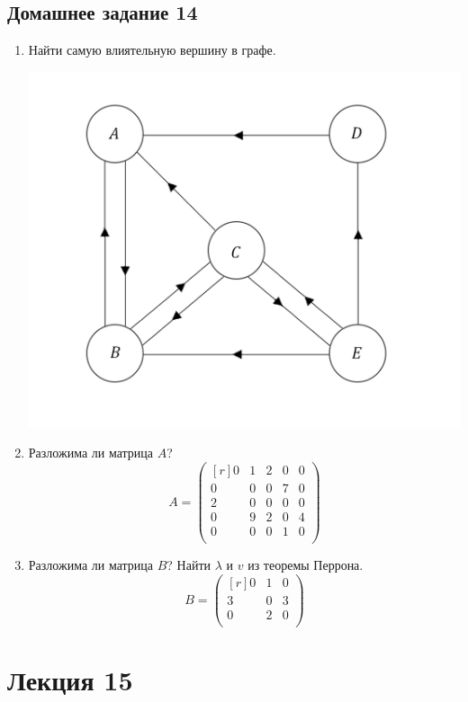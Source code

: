 \documentclass[12pt]{article}
\begin{document}
	\subsection{Домашнее задание 14}\begin{enumerate}
		\item Найти самую влиятельную вершину в графе.
		\begin{center}
			\includegraphics[scale=0.35]{l14_5_.png}\\
		\end{center}
		\item Разложима ли матрица $A$?
		\[A = \begin{pmatrix}[r]
		0 & 1 & 2 & 0 & 0\\
		0 & 0 & 0 & 7 & 0\\
		2 & 0 & 0 & 0 & 0\\
		0 & 9 & 2 & 0 & 4\\
		0 & 0 & 0 & 1 & 0\\
		\end{pmatrix}\]
		\item Разложима ли матрица $B$? Найти $\lambda$ и $v$ из теоремы Перрона.
		\[B = \begin{pmatrix}[r]
		0 & 1 & 0\\
		3 & 0 & 3\\
		0 & 2 & 0\\
		\end{pmatrix}\]
	\end{enumerate}


	\newpage
	\section{Лекция 15}
\end{document}
